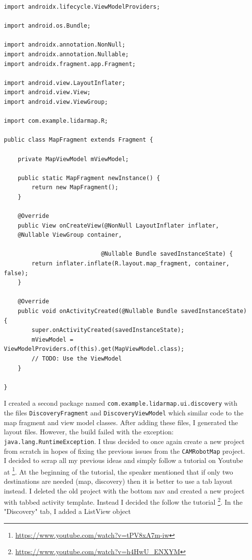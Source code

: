 \documentclass[fontsize=11pt, %
                             paper=a4, %
                             twoside, %
                             captions=tableheading,
                             index=totoc,
                             hyperref]{labbook}
\begin{document}
\begin{addmargin}[0cm]{0cm}
\begin{Verbatim}
import androidx.lifecycle.ViewModelProviders;

import android.os.Bundle;

import androidx.annotation.NonNull;
import androidx.annotation.Nullable;
import androidx.fragment.app.Fragment;

import android.view.LayoutInflater;
import android.view.View;
import android.view.ViewGroup;

import com.example.lidarmap.R;

public class MapFragment extends Fragment {

    private MapViewModel mViewModel;

    public static MapFragment newInstance() {
        return new MapFragment();
    }

    @Override
    public View onCreateView(@NonNull LayoutInflater inflater, 
    @Nullable ViewGroup container,
                             
                            @Nullable Bundle savedInstanceState) {
        return inflater.inflate(R.layout.map_fragment, container, false);
    }

    @Override
    public void onActivityCreated(@Nullable Bundle savedInstanceState) {
        super.onActivityCreated(savedInstanceState);
        mViewModel = ViewModelProviders.of(this).get(MapViewModel.class);
        // TODO: Use the ViewModel
    }

}
\end{Verbatim}
I created a second package named \texttt{com.example.lidarmap.ui.discovery} with the files \texttt{DiscoveryFragment} and \texttt{DiscoveryViewModel} which similar code to the map fragment and view model classes. After adding these files, I generated the layout files. However, the build failed with the exception: \texttt{java.lang.RuntimeException}. I thus decided to once again create a new project from scratch in hopes of fixing the previous issues from the \texttt{CAMRobotMap} project.
\smallbreak\noindent
I decided to scrap all my previous ideas and simply follow a tutorial on Youtube at \footnote{\url{https://www.youtube.com/watch?v=tPV8xA7m-iw}}. At the beginning of the tutorial, the speaker mentioned that if only two destinations are needed (map, discovery) then it is better to use a tab layout instead. I deleted the old project with the bottom nav and created a new project with tabbed activity template. Instead I decided the follow the tutorial \footnote{\url{https://www.youtube.com/watch?v=h4HwU_ENXYM}}. In the "Discovery" tab, I added a ListView object 


\end{addmargin}
\end{document}
